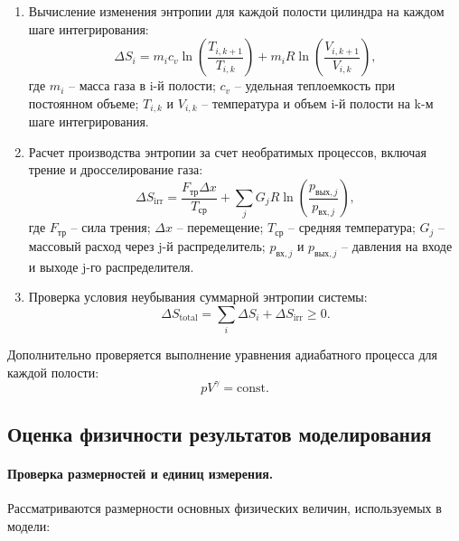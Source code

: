 \begin{enumerate}
    \item Вычисление изменения энтропии для каждой полости цилиндра на каждом шаге интегрирования:
          \begin{equation*}
              \Delta S_i = m_i c_v \ln\left(\frac{T_{i,k+1}}{T_{i,k}}\right) + m_i R \ln\left(\frac{V_{i,k+1}}{V_{i,k}}\right),
          \end{equation*}
          где $m_i$ -- масса газа в i-й полости;
          $c_v$ -- удельная теплоемкость при постоянном объеме;
          $T_{i,k}$ и $V_{i,k}$ -- температура и объем i-й полости на k-м шаге интегрирования.

    \item Расчет производства энтропии за счет необратимых процессов, включая трение и дросселирование газа:
          \begin{equation*}
              \Delta S_{\text{irr}} = \frac{F_{\text{тр}} \Delta x}{T_{\text{ср}}} + \sum_j G_j R \ln\left(\frac{p_{\text{вых},j}}{p_{\text{вх},j}}\right),
          \end{equation*}
          где $F_{\text{тр}}$ -- сила трения;
          $\Delta x$ -- перемещение;
          $T_{\text{ср}}$ -- средняя температура;
          $G_j$ -- массовый расход через j-й распределитель;
          $p_{\text{вх},j}$ и $p_{\text{вых},j}$ -- давления на входе и выходе j-го распределителя.

    \item Проверка условия неубывания суммарной энтропии системы:
          \begin{equation*}
              \Delta S_{\text{total}} = \sum_i \Delta S_i + \Delta S_{\text{irr}} \geq 0.
          \end{equation*}
\end{enumerate}

Дополнительно проверяется выполнение уравнения адиабатного процесса для каждой полости:
\begin{equation*}
    pV^{\gamma} = \text{const}.
\end{equation*}

\subsection{Оценка физичности результатов моделирования}\label{sec:ch2/sec7/subsec4}

\paragraph{Проверка размерностей и единиц измерения.}
Рассматриваются размерности основных физических величин, используемых в модели:

